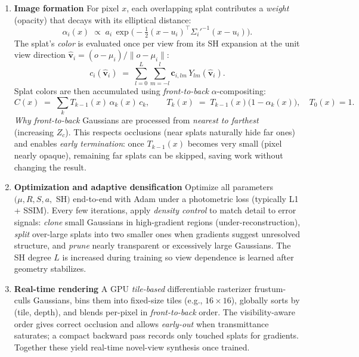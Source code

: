 \begin{enrichment}
\begin{enrichment}
\begin{enrichment}
\begin{enumerate}
            \item \textbf{Image formation} \; For pixel $x$, each overlapping splat contributes a \emph{weight} (opacity) that decays with its elliptical distance:
            \[
            \alpha_i(x)\;\propto\; a_i\,\exp\!\Big(-\tfrac{1}{2}(x-u_i)^{\top}{\Sigma_i'}^{-1}(x-u_i)\Big).
            \]
            The splat’s \emph{color} is evaluated once per view from its SH expansion at the unit view direction $\hat{\mathbf{v}}_i=(o-\mu_i)/\|o-\mu_i\|$:
            \[
            c_i(\hat{\mathbf{v}}_i)\;=\;\sum_{l=0}^{L}\sum_{m=-l}^{l}\mathbf{c}_{i,lm}\,Y_{lm}(\hat{\mathbf{v}}_i).
            \]
            Splat colors are then accumulated using \emph{front-to-back} $\alpha$-compositing:
            \[
            C(x)\;=\;\sum_{k} T_{k-1}(x)\,\alpha_k(x)\,c_k,\qquad
            T_k(x)\;=\;T_{k-1}(x)\bigl(1-\alpha_k(x)\bigr),\quad T_0(x)=1.
            \]
            \textit{Why front-to-back} \; Gaussians are processed from \emph{nearest to farthest} (increasing $Z_c$). This respects occlusions (near splats naturally hide far ones) and enables \emph{early termination}: once $T_{k-1}(x)$ becomes very small (pixel nearly opaque), remaining far splats can be skipped, saving work without changing the result.
            
            \item \textbf{Optimization and adaptive densification} \; Optimize all parameters $(\mu,R,S,a,$ SH$)$ end-to-end with Adam under a photometric loss (typically L1 + SSIM). Every few iterations, apply \emph{density control} to match detail to error signals: 
            \emph{clone} small Gaussians in high-gradient regions (under-reconstruction), \emph{split} over-large splats into two smaller ones when gradients suggest unresolved structure, and \emph{prune} nearly transparent or excessively large Gaussians. The SH degree $L$ is increased during training so view dependence is learned after geometry stabilizes.
            
            \item \textbf{Real-time rendering} \; A GPU \emph{tile-based} differentiable rasterizer frustum-culls Gaussians, bins them into fixed-size tiles (e.g., $16{\times}16$), globally sorts by (tile, depth), and blends per-pixel in \emph{front-to-back} order. The visibility-aware order gives correct occlusion and allows \emph{early-out} when transmittance saturates; a compact backward pass records only touched splats for gradients. Together these yield real-time novel-view synthesis once trained.
        \end{enumerate}
        

\end{enrichment}
\end{enrichment}
\end{enrichment}
